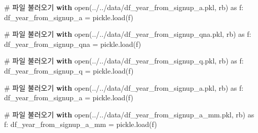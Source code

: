 \documentclass[
  letterpaper,
  DIV=11,
  numbers=noendperiod]{scrartcl}
\newenvironment{Shaded}{\begin{snugshade}}{\end{snugshade}}
\newcommand{\BuiltInTok}[1]{\textcolor[rgb]{0.00,0.23,0.31}{#1}}
\newcommand{\CommentTok}[1]{\textcolor[rgb]{0.37,0.37,0.37}{#1}}
\newcommand{\ControlFlowTok}[1]{\textcolor[rgb]{0.00,0.23,0.31}{\textbf{#1}}}
\newcommand{\ImportTok}[1]{\textcolor[rgb]{0.00,0.46,0.62}{#1}}
\newcommand{\NormalTok}[1]{\textcolor[rgb]{0.00,0.23,0.31}{#1}}
\newcommand{\OperatorTok}[1]{\textcolor[rgb]{0.37,0.37,0.37}{#1}}
\newcommand{\StringTok}[1]{\textcolor[rgb]{0.13,0.47,0.30}{#1}}
\begin{document}
\begin{Shaded}
\begin{Highlighting}[]
\CommentTok{\# 파일 불러오기}
\ControlFlowTok{with} \BuiltInTok{open}\NormalTok{(}\StringTok{\textquotesingle{}../../data/df\_year\_from\_signup\_a.pkl\textquotesingle{}}\NormalTok{, }\StringTok{\textquotesingle{}rb\textquotesingle{}}\NormalTok{) }\ImportTok{as}\NormalTok{ f:}
\NormalTok{    df\_year\_from\_signup\_a }\OperatorTok{=}\NormalTok{ pickle.load(f)}
\end{Highlighting}
\end{Shaded}

\begin{Shaded}
\begin{Highlighting}[]
\CommentTok{\# 파일 불러오기}
\ControlFlowTok{with} \BuiltInTok{open}\NormalTok{(}\StringTok{\textquotesingle{}../../data/df\_year\_from\_signup\_qna.pkl\textquotesingle{}}\NormalTok{, }\StringTok{\textquotesingle{}rb\textquotesingle{}}\NormalTok{) }\ImportTok{as}\NormalTok{ f:}
\NormalTok{    df\_year\_from\_signup\_qna }\OperatorTok{=}\NormalTok{ pickle.load(f)}
\end{Highlighting}
\end{Shaded}

\begin{Shaded}
\begin{Highlighting}[]
\CommentTok{\# 파일 불러오기}
\ControlFlowTok{with} \BuiltInTok{open}\NormalTok{(}\StringTok{\textquotesingle{}../../data/df\_year\_from\_signup\_q.pkl\textquotesingle{}}\NormalTok{, }\StringTok{\textquotesingle{}rb\textquotesingle{}}\NormalTok{) }\ImportTok{as}\NormalTok{ f:}
\NormalTok{    df\_year\_from\_signup\_q }\OperatorTok{=}\NormalTok{ pickle.load(f)}
\end{Highlighting}
\end{Shaded}

\begin{Shaded}
\begin{Highlighting}[]
\CommentTok{\# 파일 불러오기}
\ControlFlowTok{with} \BuiltInTok{open}\NormalTok{(}\StringTok{\textquotesingle{}../../data/df\_year\_from\_signup\_a.pkl\textquotesingle{}}\NormalTok{, }\StringTok{\textquotesingle{}rb\textquotesingle{}}\NormalTok{) }\ImportTok{as}\NormalTok{ f:}
\NormalTok{    df\_year\_from\_signup\_a }\OperatorTok{=}\NormalTok{ pickle.load(f)}
\end{Highlighting}
\end{Shaded}

\begin{Shaded}
\begin{Highlighting}[]
\CommentTok{\# 파일 불러오기}
\ControlFlowTok{with} \BuiltInTok{open}\NormalTok{(}\StringTok{\textquotesingle{}../../data/df\_year\_from\_signup\_a\_mm.pkl\textquotesingle{}}\NormalTok{, }\StringTok{\textquotesingle{}rb\textquotesingle{}}\NormalTok{) }\ImportTok{as}\NormalTok{ f:}
\NormalTok{    df\_year\_from\_signup\_a\_mm }\OperatorTok{=}\NormalTok{ pickle.load(f)}
\end{Highlighting}
\end{Shaded}
\end{document}
